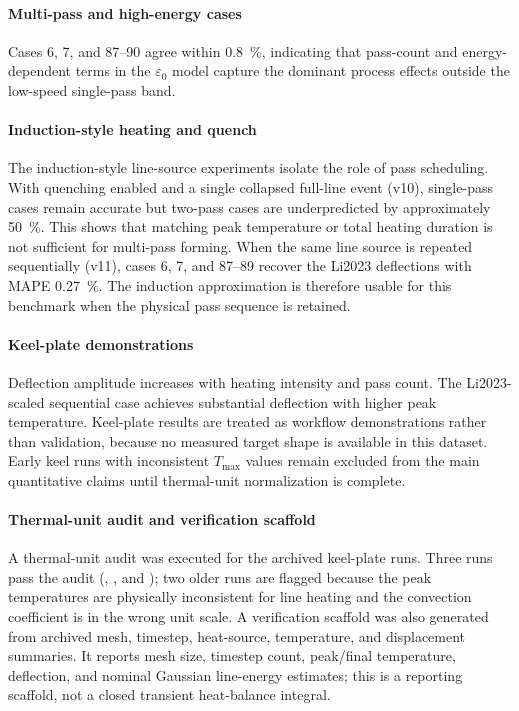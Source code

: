 \paragraph{Multi-pass and high-energy cases}
Cases 6, 7, and 87--90 agree within \SI{0.8}{\%}, indicating that pass-count and energy-dependent terms in the $\varepsilon_0$ model capture the dominant process effects outside the low-speed single-pass band.

\paragraph{Induction-style heating and quench}
The induction-style line-source experiments isolate the role of pass scheduling. With quenching enabled and a single collapsed full-line event (v10), single-pass cases remain accurate but two-pass cases are underpredicted by approximately \SI{50}{\%}. This shows that matching peak temperature or total heating duration is not sufficient for multi-pass forming. When the same line source is repeated sequentially (v11), cases 6, 7, and 87--89 recover the Li2023 deflections with MAPE \SI{0.27}{\%}. The induction approximation is therefore usable for this benchmark when the physical pass sequence is retained.

\paragraph{Keel-plate demonstrations}
Deflection amplitude increases with heating intensity and pass count. The Li2023-scaled sequential case achieves substantial deflection with higher peak temperature. Keel-plate results are treated as workflow demonstrations rather than validation, because no measured target shape is available in this dataset. Early keel runs with inconsistent $T_{\max}$ values remain excluded from the main quantitative claims until thermal-unit normalization is complete.

\paragraph{Thermal-unit audit and verification scaffold}
A thermal-unit audit was executed for the archived keel-plate runs. Three runs pass the audit (, , and ); two older runs are flagged because the peak temperatures are physically inconsistent for line heating and the convection coefficient is in the wrong unit scale. A verification scaffold was also generated from archived mesh, timestep, heat-source, temperature, and displacement summaries. It reports mesh size, timestep count, peak/final temperature, deflection, and nominal Gaussian line-energy estimates; this is a reporting scaffold, not a closed transient heat-balance integral.

